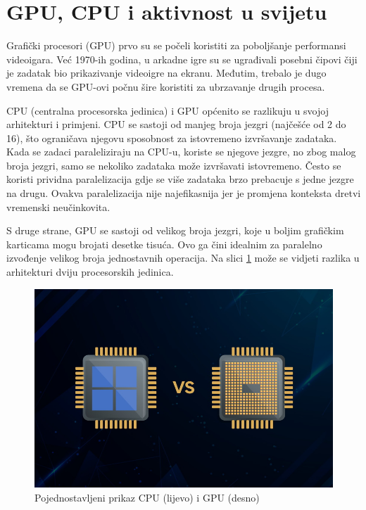 \documentclass[a4paper,twocolumn]{article}
\begin{document}
	
	\section{GPU, CPU i aktivnost u svijetu}

        Grafički procesori (GPU) prvo su se počeli koristiti za poboljšanje performansi videoigara. Već 1970-ih godina, u arkadne igre su se ugrađivali posebni čipovi čiji je zadatak bio prikazivanje videoigre na ekranu. Međutim, trebalo je dugo vremena da se GPU-ovi počnu šire koristiti za ubrzavanje drugih procesa.
        
        CPU (centralna procesorska jedinica) i GPU općenito se razlikuju u svojoj arhitekturi i primjeni. CPU se sastoji od manjeg broja jezgri (najčešće od 2 do 16), što ograničava njegovu sposobnost za istovremeno izvršavanje zadataka. Kada se zadaci paraleliziraju na CPU-u, koriste se njegove jezgre, no zbog malog broja jezgri, samo se nekoliko zadataka može izvršavati istovremeno. Često se koristi prividna paralelizacija gdje se više zadataka brzo prebacuje s jedne jezgre na drugu. Ovakva paralelizacija nije najefikasnija jer je promjena konteksta dretvi vremenski neučinkovita.
        
        S druge strane, GPU se sastoji od velikog broja jezgri, koje u boljim grafičkim karticama mogu brojati desetke tisuća. Ovo ga čini idealnim za paralelno izvođenje velikog broja jednostavnih operacija. Na slici \ref{fig:cpu_vs_gpu} može se vidjeti razlika u arhitekturi dviju procesorskih jedinica.
        
        \begin{figure}[H]
        	\centering
        	\includegraphics[width=0.7\linewidth]{slike/CPU-vs-GPU.jpg}
        	\caption{Pojednostavljeni prikaz CPU (lijevo) i GPU (desno) \cite{GPUvsCPU}}
        	\label{fig:cpu_vs_gpu}
        \end{figure}
        
\end{document}
